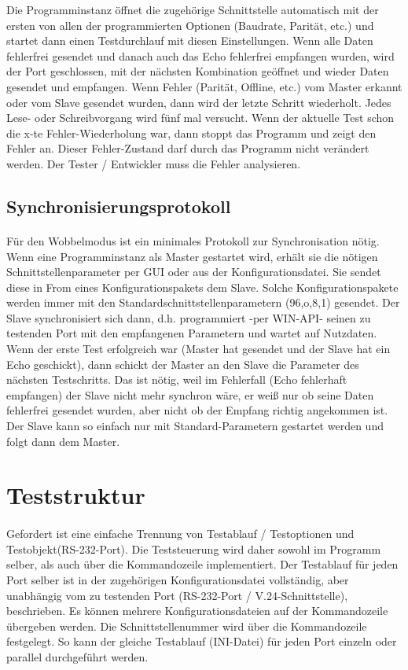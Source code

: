 Die Programminstanz öffnet die zugehörige Schnittstelle automatisch mit der ersten von allen der programmierten Optionen (Baudrate, Parität, etc.) und startet dann einen Testdurchlauf mit diesen Einstellungen. Wenn alle Daten fehlerfrei gesendet und danach auch das Echo fehlerfrei empfangen wurden,  wird der Port geschlossen, mit der nächsten Kombination geöffnet und wieder Daten gesendet und empfangen. Wenn Fehler (Parität, Offline, etc.) vom Master erkannt oder vom Slave gesendet wurden, dann wird der letzte Schritt wiederholt. Jedes Lese- oder Schreibvorgang wird fünf mal versucht. Wenn der aktuelle Test schon die x-te Fehler-Wiederholung war, dann stoppt das Programm und zeigt den Fehler an. Dieser Fehler-Zustand darf durch das Programm nicht verändert werden. Der Tester / Entwickler muss die Fehler analysieren.

\subsection{Synchronisierungsprotokoll}
\paragraph{}
Für den Wobbelmodus ist ein minimales Protokoll zur Synchronisation nötig. Wenn eine Programminstanz als Master gestartet wird, erhält sie die nötigen Schnittstellenparameter per GUI oder aus der Konfigurationsdatei. Sie sendet diese in From eines Konfigurationspakets dem Slave. Solche Konfigurationspakete werden immer mit den Standardschnittstellenparametern (96,o,8,1) gesendet. Der Slave synchronisiert sich dann, d.h. programmiert -per WIN-API- seinen zu testenden Port mit den empfangenen Parametern und wartet auf Nutzdaten.\\

Wenn der erste Test erfolgreich war (Master hat gesendet und der Slave hat ein Echo geschickt), dann schickt der Master an den Slave die Parameter des nächsten Testschritts. Das ist nötig, weil im Fehlerfall (Echo fehlerhaft empfangen) der Slave nicht mehr synchron wäre, er weiß nur ob seine Daten fehlerfrei gesendet wurden, aber nicht ob der Empfang richtig angekommen ist. Der Slave kann so einfach nur mit Standard-Parametern gestartet werden und folgt dann dem Master.


\section{Teststruktur}
\paragraph{}
Gefordert ist eine einfache Trennung von Testablauf / Testoptionen  und  Testobjekt(RS-232-Port). Die Teststeuerung wird daher sowohl im Programm selber, als auch über die Kommandozeile implementiert. Der Testablauf für jeden Port selber ist in der zugehörigen Konfigurationsdatei vollständig, aber unabhängig vom zu testenden Port (RS-232-Port / V.24-Schnittstelle), beschrieben. Es können mehrere Konfigurationsdateien auf der Kommandozeile übergeben werden. Die Schnittstellenummer wird über die Kommandozeile festgelegt. So kann der gleiche Testablauf (INI-Datei) für jeden Port einzeln oder parallel durchgeführt werden.


